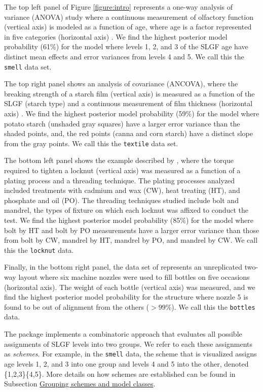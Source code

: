 The top left panel of Figure \ref{figure:intro} represents a one-way analysis of variance (ANOVA) study where a continuous measurement of olfactory function (vertical axis) is modeled as a function of age, where age is a factor represented in five categories (horizontal axis) \citep{smell}. We find the highest posterior model probability (61\%) for the model where levels 1, 2, and 3 of the SLGF age have distinct mean effects and error variances from levels 4 and 5. We call this the \texttt{smell} data set. 

The top right panel shows an analysis of covariance (ANCOVA), where the breaking strength of a starch film (vertical axis) is measured as a function of the SLGF (starch type) and a continuous measurement of film thickness (horizontal axis) \citep{Furry}. We find the highest posterior model probability (59\%) for the model where potato starch (unshaded gray squares) have a larger error variance than the shaded points, and, the red points (canna and corn starch) have a distinct slope from the gray points.  We call this the \texttt{textile} data set. 

The bottom left panel shows the example described by \citet{locknut}, where the torque required to tighten a locknut (vertical axis) was measured as a function of a plating process and a threading technique. The plating processes analyzed included treatments with cadmium and wax (CW), heat treating (HT), and phosphate and oil (PO). The threading techniques studied include bolt and mandrel, the types of fixture on which each locknut was affixed to conduct the test. We find the highest posterior model probability (85\%) for the model where bolt by HT and bolt by PO measurements have a larger error variance than those from bolt by CW, mandrel by HT, mandrel by PO, and mandrel by CW. We call this the \texttt{locknut} data. 

Finally, in the bottom right panel, the data set of \citet{bottles} represents an unreplicated two-way layout where six machine nozzles were used to fill bottles on five occasions (horizontal axis). The weight of each bottle (vertical axis) was measured, and we find the highest posterior model probability for the structure where nozzle 5 is found to be out of alignment from the others ($>99$\%). We call this the \texttt{bottles} data.

The  package implements a combinatoric approach that evaluates all possible assignments of SLGF levels into two groups. We refer to each these assignments as \textit{schemes}. For example, in the \texttt{smell} data, the scheme that is visualized assigns age levels 1, 2, and 3 into one group and levels 4 and 5 into the other, denoted \{1,2,3\}\{4,5\}. More details on how schemes are established can be found in Subsection \hyperlink{subsection:schemes}{Grouping schemes and model classes}.

